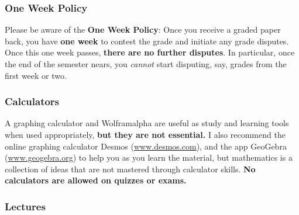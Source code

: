 \documentclass{ximera}
\begin{document}
\subsubsection*{One Week Policy}

    Please be aware of the \textbf{One Week Policy}: Once you receive a graded paper back, you have \textbf{one week} to contest the grade and initiate any grade disputes. Once this one week passes, \textbf{there are no further disputes}. In particular, once the end of the semester nears, you \textit{cannot} start disputing, say, grades from the first week or two. 


\subsubsection*{Calculators}
    A graphing calculator and Wolframalpha are useful as study and learning tools when used appropriately, \textbf{but they are not essential.}  I also recommend the online graphing calculator Desmos (\url{www.desmos.com}), and the app GeoGebra (\url{www.geogebra.org}) to help you as you learn the material, but mathematics is a collection of ideas that are not mastered through calculator skills.  \textbf{No calculators are allowed on quizzes or exams.}

\subsubsection*{Lectures}
\end{document}
